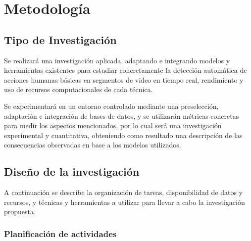 
\chapter{Metodología} \label{Metodology}

\section{Tipo de Investigación}

Se realizará una investigación aplicada, adaptando e integrando modelos y herramientas existentes para estudiar concretamente la detección automática de acciones humanas básicas en segmentos de video en tiempo real, rendimiento y uso de recursos computacionales de cada técnica.

Se experimentará en un entorno controlado mediante una preselección, adaptación e integración de bases de datos, y se utilizarán métricas concretas para medir los aspectos mencionados, por lo cual será una investigación experimental y cuantitativa, obteniendo como resultado una descripción de las consecuencias observadas en base a los modelos utilizados.

\section{Diseño de la investigación}

A continuación se describe la organización de tareas, disponibilidad de datos y recursos, y técnicas y herramientas a utilizar para llevar a cabo la investigación propuesta.

\subsection{Planificación de actividades}

